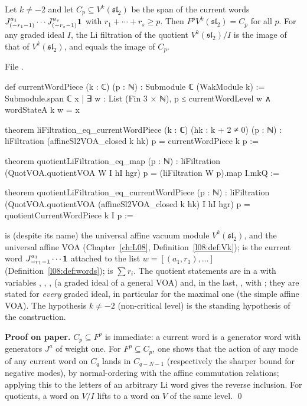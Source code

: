 \begin{theorem}\label{l11:thm:affineli}
Let $k\ne-2$ and let $C_p\subseteq V^k(\mathfrak{sl}_2)$ be the span of the current words
$J^{a_1}_{(-r_1-1)}\cdots J^{a_s}_{(-r_s-1)}\mathbf{1}$ with $r_1+\cdots+r_s\ge p$. Then $F^pV^k(\mathfrak{sl}_2) =
C_p$ for all $p$. For any graded ideal $I$, the Li filtration of the quotient $V^k(\mathfrak{sl}_2)/I$ is the image
of that of $V^k(\mathfrak{sl}_2)$, and equals the image of $C_p$.
\end{theorem}
\noindent File .
\begin{leancode}
def currentWordPiece (k : ℂ) (p : ℕ) : Submodule ℂ (WakModule k) :=
  Submodule.span ℂ
    {x | ∃ w : List (Fin 3 × ℕ), p ≤ currentWordLevel w ∧ wordStateA k w = x}

theorem liFiltration_eq_currentWordPiece (k : ℂ) (hk : k + 2 ≠ 0) (p : ℕ) :
    liFiltration (affineSl2VOA_closed k hk) p = currentWordPiece k p :=

theorem quotientLiFiltration_eq_map (p : ℕ) :
    liFiltration (QuotVOA.quotientVOA W I hI hgr) p =
      (liFiltration W p).map I.mkQ :=

theorem quotientLiFiltration_eq_currentWordPiece (p : ℕ) :
    liFiltration (QuotVOA.quotientVOA (affineSl2VOA_closed k hk) I hI hgr) p =
      quotientCurrentWordPiece k I p :=
\end{leancode}

\begin{dictionary}
 is (despite its name) the universal affine vacuum module $V^k(\mathfrak{sl}_2)$, and
\allowbreak{} the universal affine VOA (Chapter~\ref{ch:L08}, Definition~\ref{l08:def:Vk});
 is the current word $J^{a_1}_{-r_1-1}\cdots\mathbf{1}$ attached to the list
$w = [(a_1,r_1),\dots]$ (Definition~\ref{l08:def:words});  is $\sum r_i$. The quotient
statements are in a  with variables , , ,  (a graded ideal of a
general VOA) and, in the last, ,  with \allowbreak{}; they are stated
for \emph{every} graded ideal, in particular for the maximal one (the simple affine VOA). The hypothesis $k\ne-2$
(non-critical level) is the standing hypothesis of the construction.
\end{dictionary}

\textbf{Proof on paper.} $C_p\subseteq F^p$ is immediate: a current word is a generator word with generators $J^a$ of
weight one. For $F^p\subseteq C_p$, one shows that the action of any mode of any current word on $C_q$ lands in
$C_{q-N-1}$ (respectively the sharper bound for negative modes), by normal-ordering with the affine commutation
relations; applying this to the letters of an arbitrary Li word gives the reverse inclusion. For quotients, a word
on $V/I$ lifts to a word on $V$ of the same level. \qed

